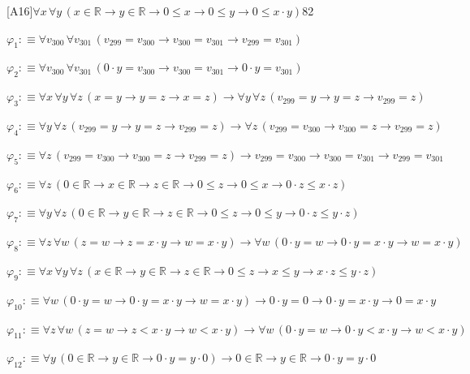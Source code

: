 \begin{fullproof}{[A16]}{$\forall x\,\forall y\,(x \in \mathbb{R} \to y \in \mathbb{R} \to 0 \leq x \to 0 \leq y \to 0 \leq x \cdot y)$}{82}
\begin{ptree}
\end{ptree}
\begin{abbrevlist}
\item $\varphi_{1} :\equiv \forall v_{300}\,\forall v_{301}\,(v_{299} = v_{300} \to v_{300} = v_{301} \to v_{299} = v_{301})$
\item $\varphi_{2} :\equiv \forall v_{300}\,\forall v_{301}\,(0 \cdot y = v_{300} \to v_{300} = v_{301} \to 0 \cdot y = v_{301})$
\item $\varphi_{3} :\equiv \forall x\,\forall y\,\forall z\,(x = y \to y = z \to x = z) \to \forall y\,\forall z\,(v_{299} = y \to y = z \to v_{299} = z)$
\item $\varphi_{4} :\equiv \forall y\,\forall z\,(v_{299} = y \to y = z \to v_{299} = z) \to \forall z\,(v_{299} = v_{300} \to v_{300} = z \to v_{299} = z)$
\item $\varphi_{5} :\equiv \forall z\,(v_{299} = v_{300} \to v_{300} = z \to v_{299} = z) \to v_{299} = v_{300} \to v_{300} = v_{301} \to v_{299} = v_{301}$
\item $\varphi_{6} :\equiv \forall z\,(0 \in \mathbb{R} \to x \in \mathbb{R} \to z \in \mathbb{R} \to 0 \leq z \to 0 \leq x \to 0 \cdot z \leq x \cdot z)$
\item $\varphi_{7} :\equiv \forall y\,\forall z\,(0 \in \mathbb{R} \to y \in \mathbb{R} \to z \in \mathbb{R} \to 0 \leq z \to 0 \leq y \to 0 \cdot z \leq y \cdot z)$
\item $\varphi_{8} :\equiv \forall z\,\forall w\,(z = w \to z = x \cdot y \to w = x \cdot y) \to \forall w\,(0 \cdot y = w \to 0 \cdot y = x \cdot y \to w = x \cdot y)$
\item $\varphi_{9} :\equiv \forall x\,\forall y\,\forall z\,(x \in \mathbb{R} \to y \in \mathbb{R} \to z \in \mathbb{R} \to 0 \leq z \to x \leq y \to x \cdot z \leq y \cdot z)$
\item $\varphi_{10} :\equiv \forall w\,(0 \cdot y = w \to 0 \cdot y = x \cdot y \to w = x \cdot y) \to 0 \cdot y = 0 \to 0 \cdot y = x \cdot y \to 0 = x \cdot y$
\item $\varphi_{11} :\equiv \forall z\,\forall w\,(z = w \to z < x \cdot y \to w < x \cdot y) \to \forall w\,(0 \cdot y = w \to 0 \cdot y < x \cdot y \to w < x \cdot y)$
\item $\varphi_{12} :\equiv \forall y\,(0 \in \mathbb{R} \to y \in \mathbb{R} \to 0 \cdot y = y \cdot 0) \to 0 \in \mathbb{R} \to y \in \mathbb{R} \to 0 \cdot y = y \cdot 0$

\end{abbrevlist}
\end{fullproof}
